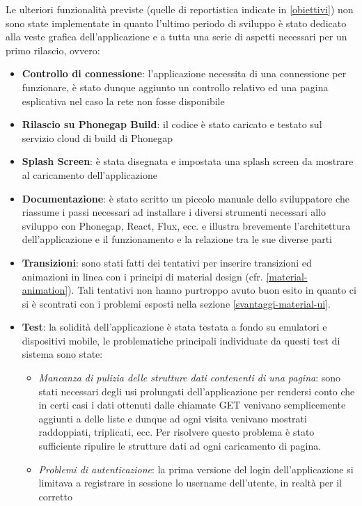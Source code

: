Le ulteriori funzionalità previste (quelle di reportistica indicate in \ref{obiettivi})
non sono state implementate in quanto l'ultimo periodo di sviluppo è stato dedicato
alla veste grafica dell'applicazione e a tutta una serie di aspetti necessari per un
primo rilascio, ovvero:

\begin{itemize}
\item \textbf{Controllo di connessione}: l'applicazione necessita di una connessione
per funzionare, è stato dunque aggiunto un controllo relativo ed una pagina esplicativa
nel caso la rete non fosse disponibile
\item \textbf{Rilascio su Phonegap Build}: il codice è stato caricato e testato sul servizio
cloud di build di Phonegap
\item \textbf{Splash Screen}: è stata disegnata e impostata una splash screen da mostrare
al caricamento dell'applicazione
\item \textbf{Documentazione}: è stato scritto un piccolo manuale dello sviluppatore che
riassume i passi necessari ad installare i diversi strumenti necessari allo sviluppo con
Phonegap, React, Flux, ecc. e illustra brevemente l'architettura dell'applicazione e
il funzionamento e la relazione tra le sue diverse parti
\item \textbf{Transizioni}: sono stati fatti dei tentativi per inserire transizioni ed
animazioni in linea con i principi di material design (cfr. \ref{material-animation}).
Tali tentativi non hanno purtroppo avuto buon esito in quanto ci si è scontrati con
i problemi esposti nella sezione \ref{svantaggi-material-ui}.
\item \textbf{Test}: la solidità dell'applicazione è stata testata a fondo su emulatori
e dispositivi mobile, le problematiche principali individuate da questi test di sistema
sono state:
	\begin{itemize}
	\item \textit{Mancanza di pulizia delle strutture dati contenenti di una pagina}:
	sono stati necessari degli usi prolungati dell'applicazione per rendersi conto che in
	certi casi i dati ottenuti dalle chiamate GET venivano semplicemente aggiunti a delle
	liste e dunque ad ogni visita venivano mostrati raddoppiati, triplicati,
	ecc. Per risolvere questo problema è stato sufficiente ripulire le strutture dati ad ogni
	caricamento di pagina.
	\item \textit{Problemi di autenticazione}: la prima versione del login dell'applicazione
	si limitava a registrare in sessione lo username dell'utente, in realtà per il corretto

\end{itemize}
\end{itemize}
